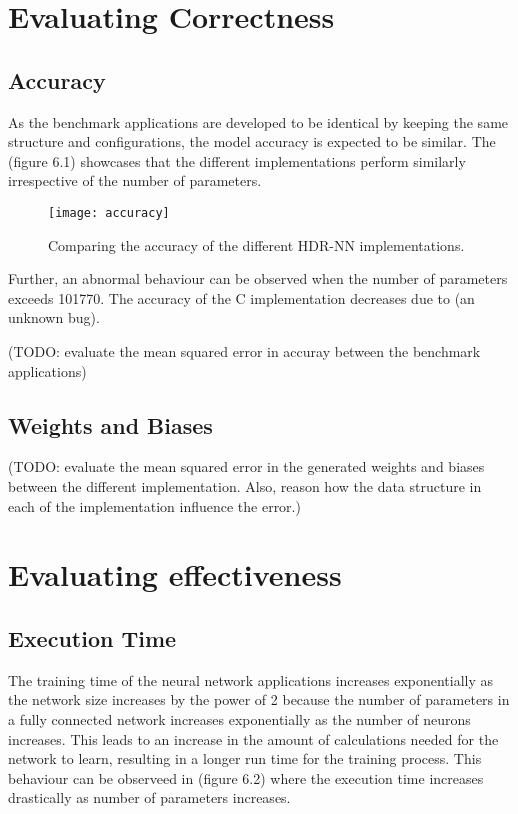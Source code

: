 \section{Evaluating Correctness}
\subsection{Accuracy}
As the benchmark applications are developed to be identical by keeping the same structure and configurations, the model accuracy is expected to be similar. The (figure 6.1) showcases that the different implementations perform similarly irrespective of the number of parameters. 

\begin{figure}[!ht]
	\centering
	\texttt{[image: accuracy]}
	\caption[HDR-NN Accuracy]{Comparing the accuracy of the different HDR-NN implementations.}
\end{figure}

Further, an abnormal behaviour can be observed when the number of parameters exceeds 101770. The accuracy of the C implementation decreases due to (an unknown bug). 

(TODO: evaluate the mean squared error in accuray between the benchmark applications)

\subsection{Weights and Biases}
(TODO: evaluate the mean squared error in the generated weights and biases between the different implementation. Also, reason how the data structure in each of the implementation influence the error.)


\section{Evaluating effectiveness}
\subsection{Execution Time}
The training time of the neural network applications increases exponentially as the network size increases by the power of 2 because the number of parameters in a fully connected network increases exponentially as the number of neurons increases. This leads to an increase in the amount of calculations needed for the network to learn, resulting in a longer run time for the training process. This behaviour can be observeed in (figure 6.2) where the execution time increases drastically as number of parameters increases. 

